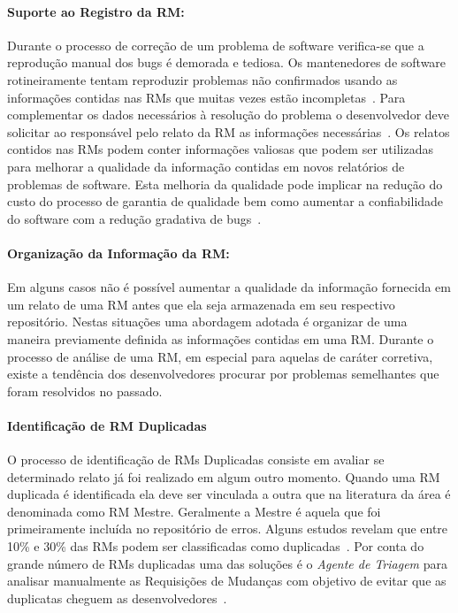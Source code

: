 \paragraph{Suporte ao Registro da RM:} Durante o processo de correção de um
problema de software verifica-se que a reprodução manual dos bugs é demorada e
tediosa. Os mantenedores de software rotineiramente tentam reproduzir problemas
não confirmados usando as informações contidas nas RMs que muitas vezes estão
incompletas~\cite{White:2015:GRR:2820282.2820291}. Para complementar os dados
necessários à resolução do problema o desenvolvedor deve solicitar ao
responsável pelo relato da RM as informações necessárias~\cite{5070993}. Os
relatos contidos nas RMs podem conter informações valiosas que podem ser
utilizadas para melhorar a qualidade da informação contidas em novos relatórios
de problemas de software. Esta melhoria da qualidade pode implicar na redução do
custo do processo de garantia de qualidade bem como aumentar a confiabilidade do
software com a redução gradativa de bugs~\cite{Tu:2014:MQI:2677832.2677844}.

\paragraph{Organização da Informação da RM:} Em alguns casos não é possível
aumentar a qualidade da informação fornecida em um relato de uma RM antes que
ela seja armazenada em seu respectivo repositório.  Nestas situações uma
abordagem adotada é organizar de uma maneira previamente definida as informações
contidas em uma RM\@. Durante o processo de análise de uma RM, em especial para
aquelas de caráter corretiva, existe a tendência dos desenvolvedores procurar
por problemas semelhantes que foram resolvidos no passado.

\paragraph{Identificação de RM Duplicadas} O processo de identificação de RMs
Duplicadas consiste em avaliar se determinado relato já foi realizado em algum
outro momento. Quando uma RM duplicada é identificada ela deve ser vinculada a
outra que na literatura da área é denominada como RM Mestre. Geralmente a Mestre
é aquela que foi primeiramente incluída no repositório de erros. Alguns estudos
revelam que entre 10\% e 30\% das RMs podem ser classificadas como
duplicadas~\cite{anvik2005coping,cavalcanti2013bug,Runeson:2007:DDD:1248820.1248882}.
Por conta do grande número de RMs duplicadas uma das soluções é o
\textit{Agente de Triagem} para analisar manualmente as Requisições de Mudanças
com objetivo de evitar que as duplicatas cheguem as
desenvolvedores~\cite{anvik2005coping}.

